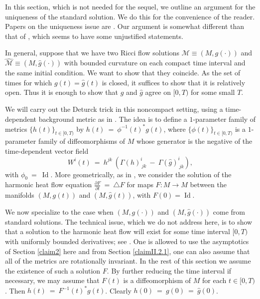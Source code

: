 \documentclass[12pt]{amsart}
\newcommand{\Id}{\operatorname{Id}}
\newcommand{\M}{{\mathcal M}}
\numberwithin{equation}{section}
\theoremstyle{plain}
\theoremstyle{definition}
\theoremstyle{remark}
\begin{document}
In this section, which is not needed for the sequel, 
we outline an argument for the  
uniqueness of the standard solution.
We do this for the convenience of the reader.
Papers on the uniqueness issue are
\cite{Chen-Zhu,Lu-Tian}.
Our argument is somewhat different than that of 
\cite[Proof of Claim 3 of Section 2]{Perelman2},
which seems to have some unjustified statements.

In general,
suppose that we have
two Ricci flow solutions $\M \equiv (M, g(\cdot))$ and 
$\widehat{\M} \equiv (M, \widehat{g}(\cdot))$ with bounded curvature
on each compact time interval and the same initial condition.
We want to show that they coincide.
As the set of times for which $g(t) = \widehat{g}(t)$
is closed, it suffices to show that it is relatively open.  Thus
it is enough to show that $g$ and $\widehat{g}$ agree on $[0, T)$ 
for some small $T$.

We will carry out the Deturck trick in this noncompact setting,
using a time-dependent background metric as in 
\cite[Section 2]{Anderson-Chow}. The idea is to
define a $1$-parameter family of metrics $\{h(t)\}_{t \in [0, T)}$ by
$h(t) \: = \: \phi^{-1}(t)^* g(t)$, where
$\{\phi(t)\}_{t \in [0, T)}$ is a $1$-parameter family of
diffeomorphisms of $M$ whose generator is the negative of the time-dependent
vector field
\begin{equation} \label{Weqn}
W^i(t) \: = \: h^{jk} \: \left( \Gamma(h)^i_{\: jk} \: - \: 
\Gamma(\widehat{g})^i_{\: jk} \right),
\end{equation}
with $\phi_0 \: = \: \Id$.
More geometrically, as in \cite[Section 6]{Hamilton}, we consider
the solution of the harmonic heat flow equation
$\frac{\partial F}{\partial t} \: = \: \triangle F$ for maps
$F : M \rightarrow M$ between the
manifolds $(M, g(t))$ and $(M, \widehat{g}(t))$, with $F(0) = \Id$. 

We now specialize to the case when 
$(M, g(\cdot))$ and 
$(M, \widehat{g}(\cdot))$ come from standard solutions.
The technical issue, which we do not address here, is to show
that a solution to the harmonic heat flow
will exist for some time interval $[0, T)$ with uniformly
bounded derivatives; see \cite{Chen-Zhu}.
One is allowed to use the asymptotics of 
Section \ref{claim2} here and
from Section \ref{claimII.2.1},
one can also assume that all of the metrics are
rotationally invariant. In the rest of this section we assume
the existence of such a solution $F$.
By further reducing the time interval if
necessary, we may assume that $F(t)$ is a diffeomorphism of $M$
for each $t \in [0, T)$. Then $h(t) \: = \: F^{-1}(t)^* g(t)$.
Clearly $h(0) \: = \: g(0) \: = \: 
\widehat{g}(0)$.
\end{document}
